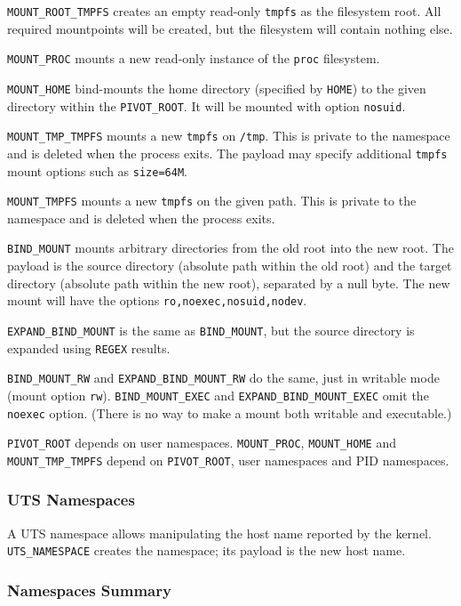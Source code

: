 \documentclass[a4paper,12pt]{article}
\begin{document}
\verb|MOUNT_ROOT_TMPFS| creates an empty read-only \texttt{tmpfs} as
the filesystem root.  All required mountpoints will be created, but
the filesystem will contain nothing else.

\verb|MOUNT_PROC| mounts a new read-only instance of the \texttt{proc}
filesystem.

\verb|MOUNT_HOME| bind-mounts the home directory (specified by
\verb|HOME|) to the given directory within the \verb|PIVOT_ROOT|.  It
will be mounted with option \texttt{nosuid}.

\verb|MOUNT_TMP_TMPFS| mounts a new \texttt{tmpfs} on \texttt{/tmp}.
This is private to the namespace and is deleted when the process
exits.  The payload may specify additional \texttt{tmpfs} mount
options such as \texttt{size=64M}.

\verb|MOUNT_TMPFS| mounts a new \texttt{tmpfs} on the given path.
This is private to the namespace and is deleted when the process
exits.

\verb|BIND_MOUNT| mounts arbitrary directories from the old root into
the new root.  The payload is the source directory (absolute path
within the old root) and the target directory (absolute path within
the new root), separated by a null byte.  The new mount will have the
options \texttt{ro,noexec,nosuid,nodev}.

\verb|EXPAND_BIND_MOUNT| is the same as \verb|BIND_MOUNT|, but the
source directory is expanded using \verb|REGEX| results.

\verb|BIND_MOUNT_RW| and \verb|EXPAND_BIND_MOUNT_RW| do the same, just
in writable mode (mount option \verb|rw|).  \verb|BIND_MOUNT_EXEC| and
\verb|EXPAND_BIND_MOUNT_EXEC| omit the \verb|noexec| option.  (There
is no way to make a mount both writable and executable.)

\verb|PIVOT_ROOT| depends on user namespaces.  \verb|MOUNT_PROC|,
\verb|MOUNT_HOME| and \verb|MOUNT_TMP_TMPFS| depend on
\verb|PIVOT_ROOT|, user namespaces and PID namespaces.

\subsubsection{UTS Namespaces}

A UTS namespace allows manipulating the host name reported by the
kernel.  \verb|UTS_NAMESPACE| creates the namespace; its payload is
the new host name.

\subsubsection{Namespaces Summary}
\end{document}
